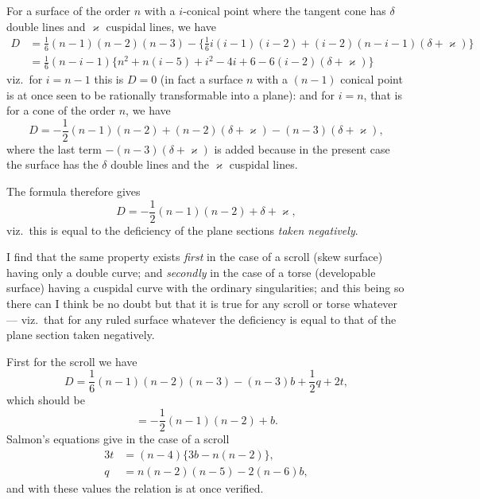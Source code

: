 \documentclass{article}
\begin{document}
For a surface of the order $n$ with a $i$-conical point where the tangent cone has $\delta$ double lines and $\varkappa$ cuspidal lines, we have
\[
\begin{aligned}
D &= \frac{1}{6}(n - 1)(n - 2)(n - 3) - \{\frac{1}{6} i(i - 1)(i - 2) + (i - 2)(n - i - 1)(\delta + \varkappa)\} \\
&= \frac{1}{6}(n - i - 1)\{n^2 + n(i - 5) + i^2 - 4i + 6 - 6(i - 2)(\delta + \varkappa)\}
\end{aligned}
\]
viz.\ for $i = n - 1$ this is $D = 0$ (in fact a surface $n$ with a $(n - 1)$ conical point is at once seen to be rationally transformable into a plane): and for $i = n$, that is for a cone of the order $n$, we have
\[
D = -\frac{1}{2}(n - 1)(n - 2) + (n - 2)(\delta + \varkappa) - (n - 3)(\delta + \varkappa),
\]
where the last term $-(n - 3)(\delta + \varkappa)$ is added because in the present case the surface has the $\delta$ double lines and the $\varkappa$ cuspidal lines.

The formula therefore gives
\[
D = -\frac{1}{2}(n - 1)(n - 2) + \delta + \varkappa,
\]
viz.\ this is equal to the deficiency of the plane sections \emph{taken negatively}.

I find that the same property exists \emph{first} in the case of a scroll (skew surface) having only a double curve; and \emph{secondly} in the case of a torse (developable surface) having a cuspidal curve with the ordinary singularities; and this being so there can I think be no doubt but that it is true for any scroll or torse whatever --- viz.\ that for any ruled surface whatever the deficiency is equal to that of the plane section taken negatively.

First for the scroll we have
\[
D = \frac{1}{6}(n - 1)(n - 2)(n - 3) - (n - 3)b + \frac{1}{2}q + 2t,
\]
which should be
\[
= -\frac{1}{2}(n - 1)(n - 2) + b.
\]
Salmon's equations give in the case of a scroll
\[
\begin{aligned}
3t &= (n - 4)\{3b - n(n - 2)\}, \\
q &= n(n - 2)(n - 5) - 2(n - 6)b,
\end{aligned}
\]
and with these values the relation is at once verified.
\end{document}
